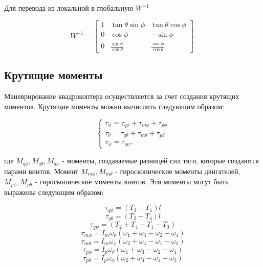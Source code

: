 Для перевода из локальной в глобальную \(W^{-1}\)

\begin{equation}
W^{-1} = \begin{bmatrix}
1 & \tan\theta \sin\phi & \tan\theta \cos\phi \\
0 & \cos\phi & -\sin\phi \\
0 & \frac{\sin\phi}{\cos\theta} & \frac{\cos\phi}{\cos\theta}
\end{bmatrix}.
\end{equation}

\subsection{Крутящие моменты}

Маневрирование квадрокоптера осуществляется за счет создания крутящих моментов. 
Крутящие моменты можно вычислить следующим образом:

\begin{equation}
\begin{cases}
    \tau_{\phi} = \tau_{q\phi} + \tau_{m\phi} + \tau_{p\phi}\\
    \tau_{\theta} = \tau_{q\theta} + \tau_{m\theta} + \tau_{p\theta}\\
    \tau_{\psi} = \tau_{q\psi},
\end{cases}
\end{equation}

где \(M_{q\phi}, M_{q\theta}, M_{q\psi}\) - моменты, создаваемые разницей сил тяги, которые создаются парами винтов.
Момент \(M_{m\phi}, M_{m\theta}\) - гироскопические моменты двигателей, \(M_{p\phi}, M_{p\theta}\)
 - гироскопические моменты винтов. Эти моменты могут быть выражены следующим образом:

\begin{equation}
\tau_{q\phi} = (T_3 - T_1)l
\end{equation}
\begin{equation}
\tau_{q\theta} = (T_2 - T_4)l 
\end{equation} 
\begin{equation}
\tau_{q\psi} = (T_2 + T_4 - T_1 - T_3)
\end{equation} 
\begin{equation}
\tau_{m\phi} = I_m \omega_{\theta}(\omega_1+\omega_3-\omega_2-\omega_4)
\end{equation} 
\begin{equation}
\tau_{m\theta} = I_m \omega_{\phi}(\omega_2+\omega_4-\omega_1-\omega_3)
\end{equation} 
\begin{equation}
\tau_{p\phi} = I_p \omega_{\theta}(\omega_1+\omega_3-\omega_2-\omega_4)
\end{equation} 
\begin{equation}
\tau_{p\theta} = I_p \omega_{\phi}(\omega_2+\omega_4-\omega_1-\omega_3)
\end{equation} 

